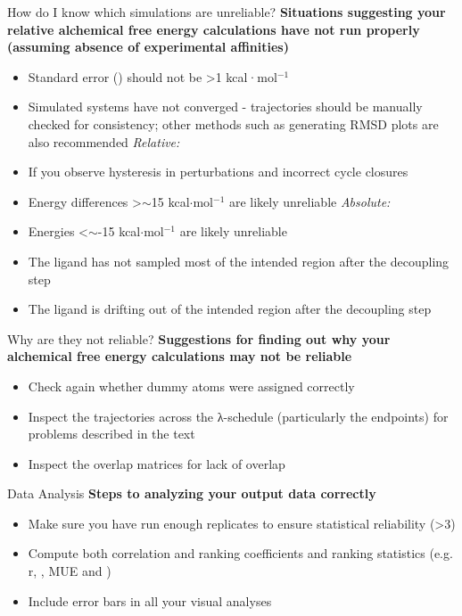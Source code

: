 \documentclass[9pt,bestpractices]{livecoms}
\begin{document}
\begin{Checklists*}
\begin{checklist}{How do I know which simulations are unreliable?}
    \textbf{Situations suggesting your relative alchemical free energy calculations have not run properly (assuming absence of experimental affinities)}
        \begin{itemize}
                \item Standard error (\textsigma) should not be \textgreater1 kcal·mol$^{-1}$ 
    \item Simulated systems have not converged - trajectories should be manually checked for consistency; other methods such as generating RMSD plots are also recommended
    \newline\newline\textit{Relative:}
    \item If you observe hysteresis in perturbations and incorrect cycle closures
    \item Energy differences \textgreater$\sim$15 kcal$\cdot$mol$^{-1}$  are likely unreliable
    \newline\newline\textit{Absolute:}
    \item Energies \textless$\sim$-15 kcal$\cdot$mol$^{-1}$  are likely unreliable
    \item The ligand has not sampled most of the intended region after the decoupling step
    \item The ligand is drifting out of the intended region after the decoupling step
        \end{itemize}
\end{checklist}

\begin{checklist}{Why are they not reliable?}
    \textbf{Suggestions for finding out why your alchemical free energy calculations may not be reliable}
\begin{itemize}
    \item Check again whether dummy atoms were assigned correctly
    \item Inspect the trajectories across the λ-schedule (particularly the endpoints) for problems described in the text
    \item Inspect the overlap matrices for lack of overlap
\end{itemize}
\end{checklist}

\begin{checklist}{Data Analysis}
    \textbf{Steps to analyzing your output data correctly}
\begin{itemize}
    \item Make sure you have run enough replicates to ensure statistical reliability (\textgreater3)
    \item Compute both correlation and ranking coefficients and ranking statistics (e.g. r, \textrho, MUE and \texttau)
    \item Include error bars in all your visual analyses
\end{itemize}
\end{checklist}
\end{Checklists*}
\clearpage
\end{document}
